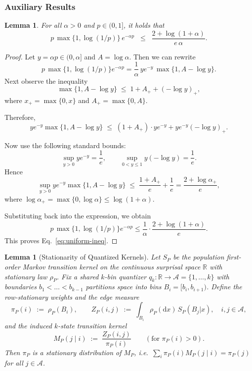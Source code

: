 \documentclass{article}
\theoremstyle{plain}
\newtheorem{lemma}[theorem]{Lemma}
\theoremstyle{definition}
\theoremstyle{remark}
\begin{document}
\subsubsection{Auxiliary Results}
\begin{lemma}
\label{lem:uniform-bound}
For all $\alpha > 0$ and $p \in (0,1]$, it holds that
\begin{equation}
  p \, \max\{1, \log(1/p)\} \, e^{-\alpha p}
  \;\;\le\;\; \frac{2 + \log(1+\alpha)}{e\,\alpha}.
  \label{eq:uniform-ineq}
\end{equation}
\end{lemma}

\begin{proof}
Let $y = \alpha p \in (0,\alpha]$ and $A = \log \alpha$. Then we can rewrite
\[
p \, \max\{1,\log(1/p)\} e^{-\alpha p}
= \frac{1}{\alpha} \, y e^{-y} \, \max\{1, A - \log y\}.
\]
Next observe the inequality
\[
\max\{1, A-\log y\} \;\le\; 1 + A_{+} + (-\log y)_{+},
\]
where $x_{+}=\max\{0,x\}$ and $A_{+}=\max\{0,A\}$.

Therefore,
\[
y e^{-y} \max\{1,A-\log y\}
\;\le\; (1+A_{+}) \cdot y e^{-y} + y e^{-y}(-\log y)_{+}.
\]

Now use the following standard bounds:
\[
\sup_{y>0} y e^{-y} = \frac{1}{e}, 
\qquad
\sup_{0<y\le 1} y(-\log y) = \frac{1}{e}.
\]
Hence
\[
\sup_{y>0} y e^{-y} \max\{1, A-\log y\}
\;\le\; \frac{1+A_{+}}{e} + \frac{1}{e}
= \frac{2 + \log\alpha_{+}}{e},
\]
where $\log\alpha_{+} = \max\{0,\log \alpha\} \le \log(1+\alpha)$.

Substituting back into the expression, we obtain
\[
p \, \max\{1, \log(1/p)\} e^{-\alpha p}
\le \frac{1}{\alpha}\cdot \frac{2+\log(1+\alpha)}{e}.
\]
This proves Eq.~\ref{eq:uniform-ineq}.
\end{proof}

\begin{lemma}[Stationarity of Quantized Kernels]\label{lem:quant-stationary}
Let $S_P$ be the population first-order Markov transition kernel on the continuous surprisal space $\mathbb{R}$ with stationary law $\rho_P$. 
Fix a shared $k$-bin quantizer $q_k:\mathbb{R}\to\mathcal A=\{1,\dots,k\}$ with boundaries $b_1<\dots <b_{k-1}$ partitions space into bins $B_i=[b_i,b_{i+1})$. 
Define the row-stationary weights and the edge measure
\[
\pi_P(i)\;:=\;\rho_P(B_i),\qquad 
Z_P(i,j)\;:=\;\int_{B_i}\rho_P(\mathrm{d}x)\,S_P(B_j|x),\quad i,j\in\mathcal A,
\]
and the induced $k$-state transition kernel
\[
M_P(j\mid i)\;:=\;\frac{Z_P(i,j)}{\pi_P(i)}\qquad(\text{for }\pi_P(i)>0).
\]
Then $\pi_P$ is a stationary distribution of $M_P$, i.e.\ $\sum_{i}\pi_P(i)M_P(j\mid i)=\pi_P(j)$ for all $j\in\mathcal A$.
\end{lemma}
\end{document}
